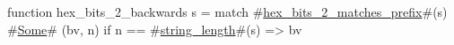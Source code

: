 function hex_bits_2_backwards s =
  match #\hyperref[sailRISCVzhexzybitszy2zymatcheszyprefix]{hex\_bits\_2\_matches\_prefix}#(s) {
      #\hyperref[sailRISCVzSome]{Some}# (bv, n) if n == #\hyperref[sailRISCVzstringzylength]{string\_length}#(s) => bv
  }
